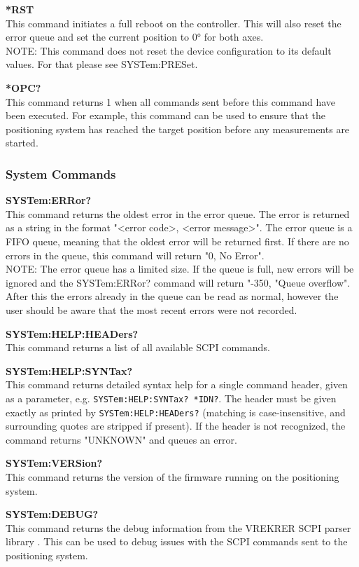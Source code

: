 \textbf{*RST} \\
This command initiates a full reboot on the controller. This will also reset the error queue and set the current position to 0° for both axes. \\
NOTE: This command does not reset the device configuration to its default values. For that please see SYSTem:PRESet.

\textbf{*OPC?} \\
This command returns 1 when all commands sent before this command have been executed. For example, this command can be used to ensure that the positioning system has reached the target position before any measurements are started.

\subsubsection{System Commands} \label{sec:system_commands}
\textbf{SYSTem:ERRor?} \\
This command returns the oldest error in the error queue. The error is returned as a string in the format "<error code>, <error message>". The error queue is a FIFO queue, meaning that the oldest error will be returned first. If there are no errors in the queue, this command will return "0, No Error". \\
NOTE: The error queue has a limited size. If the queue is full, new errors will be ignored and the SYSTem:ERRor? command will return "-350, "Queue overflow". After this the errors already in the queue can be read as normal, however the user should be aware that the most recent errors were not recorded.

\textbf{SYSTem:HELP:HEADers?} \\
This command returns a list of all available SCPI commands.

\textbf{SYSTem:HELP:SYNTax?} \\
This command returns detailed syntax help for a single command header, given as a parameter, e.g. \texttt{SYSTem:HELP:SYNTax? *IDN?}. The header must be given exactly as printed by \texttt{SYSTem:HELP:HEADers?} (matching is case-insensitive, and surrounding quotes are stripped if present). If the header is not recognized, the command returns "UNKNOWN" and queues an error.

\textbf{SYSTem:VERSion?} \\
This command returns the version of the firmware running on the positioning system.

\textbf{SYSTem:DEBUG?} \\
This command returns the debug information from the VREKRER SCPI parser library \cite{chavez_vrekrervrekrer_scpi_parser_2025}. This can be used to debug issues with the SCPI commands sent to the positioning system.

